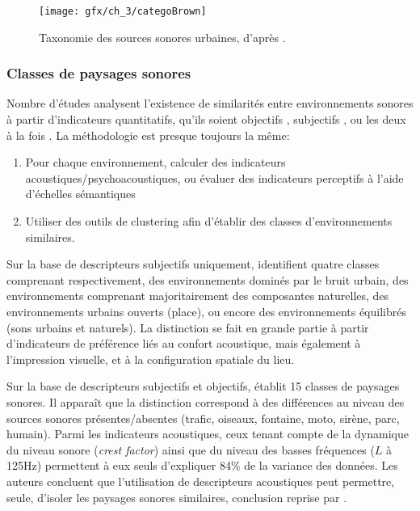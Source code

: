 \begin{figure}[t]
        \myfloatalign
        \texttt{[image: gfx/ch\_3/categoBrown]}
        \caption[Taxonomie des sources sonores urbaines.]{Taxonomie des sources sonores urbaines, d'après \citep{brown2011towards}.}\label{fig:catSoundscapeBrown}
\end{figure}

\subsubsection{Classes de paysages sonores}
\label{sec:ch3_classePaysage}

Nombre d'études analysent l'existence de similarités entre environnements sonores à partir d'indicateurs quantitatifs, qu'ils soient objectifs \citep{rychtarikova2013soundscape}, subjectifs \citep{jeon2013soundwalk}, ou les deux à la fois \citep{torija2013application,ricciardi2015sound}. La méthodologie est presque toujours la même:

\begin{enumerate}
\item Pour chaque environnement, calculer des indicateurs acoustiques/psychoacoustiques, ou évaluer des indicateurs perceptifs à l'aide d'échelles sémantiques
\item Utiliser des outils de clustering afin d'établir des classes d'environnements similaires.
\end{enumerate}

Sur la base de descripteurs subjectifs uniquement, \citep{jeon2013soundwalk} identifient quatre classes comprenant respectivement, des environnements dominés par le bruit urbain, des environnements comprenant majoritairement des composantes naturelles, des environnements urbains ouverts (place), ou encore des environnements équilibrés (sons urbains et naturels). La distinction se fait en grande partie à partir d'indicateurs de préférence liés au confort acoustique, mais également à l'impression visuelle, et à la configuration spatiale du lieu.  

Sur la base de descripteurs subjectifs et objectifs, \citep{torija2013application} établit 15 classes de paysages sonores. Il apparaît que la distinction correspond à des différences au niveau des sources sonores présentes/absentes (trafic, oiseaux, fontaine, moto, sirène, parc, humain). Parmi les indicateurs acoustiques, ceux tenant compte de la dynamique du niveau sonore (\emph{crest factor}) ainsi que du niveau des basses fréquences ($L$ à 125Hz) permettent à eux seuls d'expliquer 84\% de la variance des données. Les auteurs concluent que l'utilisation de descripteurs acoustiques peut permettre, seule, d'isoler les paysages sonores similaires, conclusion reprise par \citep{rychtarikova2013soundscape}.

